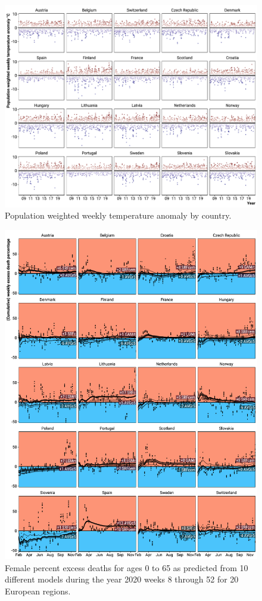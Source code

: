 \documentclass[12pt]{article}
\begin{document}
\begin{appendix}
\begin{figure}
  \caption{Population weighted weekly temperature anomaly by country.}
  \includegraphics{tanomaly.pdf}
  \end{figure}


\begin{figure}
\caption{
Female percent excess deaths for ages 0 to 65 as predicted from 10 different models during the year 2020 weeks 8 through 52 for 20 European regions.}
\label{fig:excessf0to65}
\includegraphics{excess_female__0_65_.pdf}
\end{figure}


\end{appendix}
\end{document}
